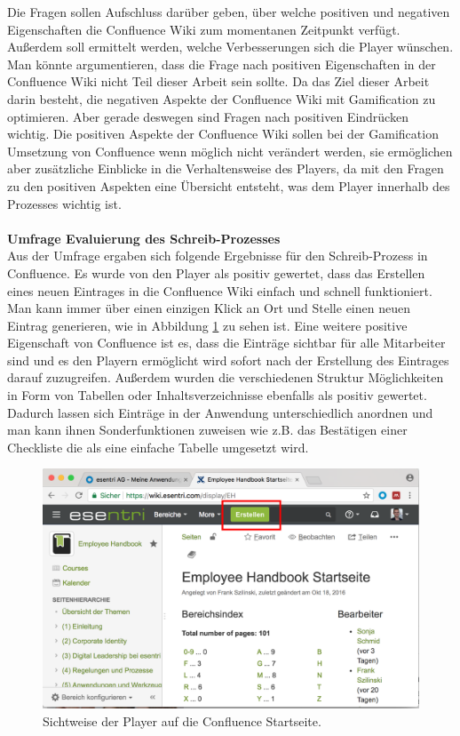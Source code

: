 \documentclass[a4paper,12pt,twoside]{scrartcl}
\begin{document}
Die Fragen sollen Aufschluss darüber geben, über welche positiven und negativen Eigenschaften die Confluence Wiki zum momentanen Zeitpunkt verfügt. Außerdem soll ermittelt werden, welche Verbesserungen sich die Player wünschen. Man könnte argumentieren, dass die Frage nach positiven Eigenschaften in der Confluence Wiki nicht Teil dieser Arbeit sein sollte. Da das Ziel dieser Arbeit darin besteht, die negativen Aspekte der Confluence Wiki mit Gamification zu optimieren. Aber gerade deswegen sind Fragen nach positiven Eindrücken wichtig. Die positiven Aspekte der Confluence Wiki sollen bei der Gamification Umsetzung von Confluence wenn möglich nicht verändert werden, sie ermöglichen aber zusätzliche Einblicke in die Verhaltensweise des Players, da mit den Fragen zu den positiven Aspekten eine Übersicht entsteht, was dem Player innerhalb des Prozesses wichtig ist.
\\\\
\textbf{Umfrage Evaluierung des Schreib-Prozesses}\\
Aus der Umfrage ergaben sich folgende Ergebnisse für den Schreib-Prozess in Confluence. Es wurde von den Player als positiv gewertet, dass das Erstellen eines neuen Eintrages in die Confluence Wiki einfach und schnell funktioniert. Man kann immer über einen einzigen Klick an Ort und Stelle einen neuen Eintrag generieren, wie in Abbildung \ref{ConfluenceEintragErstellen} zu sehen ist. Eine weitere positive Eigenschaft von Confluence ist es, dass die Einträge sichtbar für alle Mitarbeiter sind und es den Playern ermöglicht wird sofort nach der Erstellung des Eintrages darauf zuzugreifen. Außerdem wurden die verschiedenen Struktur Möglichkeiten in Form von Tabellen oder Inhaltsverzeichnisse ebenfalls als positiv gewertet. Dadurch lassen sich Einträge in der Anwendung unterschiedlich anordnen und man kann ihnen Sonderfunktionen zuweisen wie z.B. das Bestätigen einer Checkliste die als eine einfache Tabelle umgesetzt wird.
\begin{figure}[h!]
\begin{center}
\includegraphics[scale = 0.4]{Bilder/ConfluenceStart.eps}
\caption{Sichtweise der Player auf die Confluence Startseite.}
\label{ConfluenceEintragErstellen}
\end{center}
\end{figure} 
\end{document}
